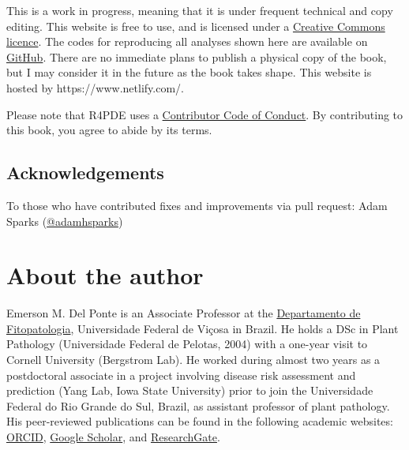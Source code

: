 \documentclass[
  letterpaper,
  DIV=11,
  numbers=noendperiod]{scrreprt}
\begin{document}
This is a work in progress, meaning that it is under frequent technical
and copy editing. This website is free to use, and is licensed under a
\href{https://creativecommons.org/licenses/by-nc/4.0/}{Creative Commons
licence}. The codes for reproducing all analyses shown here are
available on
\href{https://github.com/emdelponte/epidemiology-R}{GitHub}. There are
no immediate plans to publish a physical copy of the book, but I may
consider it in the future as the book takes shape. This website is
hosted by https://www.netlify.com/.

Please note that R4PDE uses a
\href{https://contributor-covenant.org/version/2/0/CODE_OF_CONDUCT.html}{Contributor
Code of Conduct}. By contributing to this book, you agree to abide by
its terms.

\hypertarget{acknowledgements}{%
\section*{Acknowledgements}\label{acknowledgements}}

To those who have contributed fixes and improvements via pull request:
Adam Sparks (\href{https://github.com/adamhsparks}{@adamhsparks})


\hypertarget{about-the-author}{%
\chapter*{About the author}\label{about-the-author}}

Emerson M. Del Ponte is an Associate Professor at the
\href{http://www.dfp.ufv.br/graduate/faculty/}{Departamento de
Fitopatologia}, Universidade Federal de Viçosa in Brazil. He holds a DSc
in Plant Pathology (Universidade Federal de Pelotas, 2004) with a
one-year visit to Cornell University (Bergstrom Lab). He worked during
almost two years as a postdoctoral associate in a project involving
disease risk assessment and prediction (Yang Lab, Iowa State University)
prior to join the Universidade Federal do Rio Grande do Sul, Brazil, as
assistant professor of plant pathology. His peer-reviewed publications
can be found in the following academic websites:
\href{https://orcid.org/0000-0003-4398-409X}{ORCID},
\href{https://scholar.google.com.br/citations?user=LgNDabAAAAAJ\&hl=en}{Google
Scholar}, and
\href{https://www.researchgate.net/profile/Emerson-Del-Ponte/research}{ResearchGate}.
\end{document}

